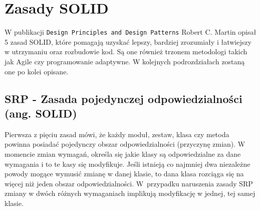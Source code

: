 
\section{Zasady SOLID}

W publikacji \texttt{Design Principles and Design Patterns} Robert C. Martin opisał 5 zasad SOLID, które pomagają uzyskać lepszy, bardziej zrozumiały i łatwiejszy w utrzymaniu oraz rozbudowie kod. Są one również trzonem metodologi takich jak Agile czy programowanie adaptywne. W kolejnych podrozdziałach zostaną one po kolei opisane. 

\subsection{SRP - Zasada pojedynczej odpowiedzialności (ang. \textbf{S}OLID)}\label{lab1/sec/srpPrinciple}

Pierwsza z pięciu zasad mówi, że każdy moduł, zestaw, klasa czy metoda powinna posiadać pojedynczy obszar odpowiedzialności (przyczynę zmian).  W momencie zmian wymagań, określa się jakie klasy są odpowiedzialne za dane wymagania i to te kasy się modyfikuje. Jeśli istnieją co najmniej dwa niezależne powody mogące wymusić zmianę w danej klasie, to dana klasa rozciąga się na więcej niż jeden obszar odpowiedzialności. W~przypadku naruszenia zasady SRP zmiany w dwóch różnych wymaganiach implikują modyfikację w jednej, tej samej klasie. 

